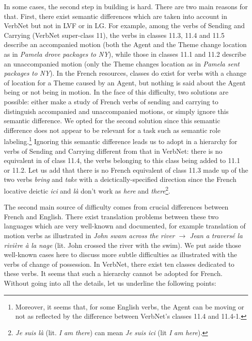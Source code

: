 In some cases, the second step in building \verbenet{} is hard. There are two
main reasons for that. First, there exist semantic differences which are taken
into account in VerbNet but not in LVF or in LG. For example, among the verbs
of Sending and Carrying (VerbNet super-class 11), the verbs in  classes 11.3,
11.4 and 11.5 describe an accompanied motion (both the Agent and the Theme
change location as in \emph{Pamela drove packages to NY}), while those in
classes 11.1 and 11.2 describe an unaccompanied motion (only the Theme changes
location as in \emph{Pamela sent packages to NY}). In the French resources,
classes do exist for verbs with a change of location for a Theme caused by an
Agent, but nothing is said about the Agent being or not being in motion.  In
the face  of this difficulty, two solutions are possible: either make a study
of French verbs of sending and carrying to distinguish accompanied and
unaccompanied motions, or simply ignore this semantic difference. We opted for
the second solution since this semantic difference does not appear to be
relevant for a task such as semantic role labeling.\footnote{Moreover, it seems
that, for some English verbs, the Agent can be moving or not as reflected by
the difference between VerbNet's classes 11.4 and 11.4-1.} Ignoring this
semantic difference leads us to adopt in \verbenet{} a hierarchy for verbs of
Sending and Carrying different from that in VerbNet: there is no equivalent in
\verbenet{} of  class 11.4, the verbs belonging to this class being added to
11.1 or 11.2. Let us add that there is no French equivalent of class 11.3 made
up of the two verbs \emph{bring} and \emph{take} with a deictically-specified
direction \citep[page 135]{levin1993english} since the French locative
deictic \emph{ici} and \emph{là} don't work as \emph{here} and
\emph{there}\footnote{\emph{Je suis là} (lit. \emph{I am there}) can mean
\emph{Je suis ici} (lit \emph{I am here}).}.

The second main source of difficulty comes from crucial differences between
French and English. There exist translation problems between these two
languages which are very well-known and documented, for example translation of
motion verbs as illustrated in  \emph{John swam across the river} $\rightarrow$
\emph{Jean a traversé la rivière à la nage} (lit. John crossed the river with
the swim). We put aside those well-known cases here to discuss  more subtle
difficulties as illustrated with the verbs of change of possession. In VerbNet,
there exist ten classes dedicated to these verbs. It seems that such a
hierarchy cannot be adopted for French. Without going into all the details, let
us underline the following points:

